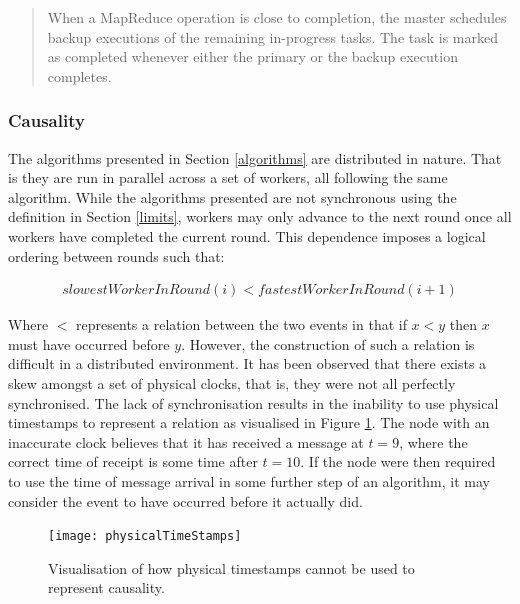 \documentclass[12pt]{article}
\begin{document}
\blockquote{When a MapReduce operation is close
to completion, the master schedules backup executions
of the remaining in-progress tasks. The task is marked
as completed whenever either the primary or the backup
execution completes.}

\subsubsection{Causality}
The algorithms presented in Section \ref{algorithms} are distributed in nature. That is they are run in parallel across a set of workers, all following the same algorithm. While the algorithms presented are not synchronous using the definition in Section \ref{limits}, workers may only advance to the next round once all workers have completed the current round. This dependence imposes a logical ordering between rounds such that:

\begin{align*}
slowestWorkerInRound(i) < fastestWorkerInRound(i+1)
\end{align*}

Where $<$ represents a  relation between the two events in that if $x < y$ then $x$ must have occurred before $y$. However, the construction of such a relation is difficult in a distributed environment. It has been observed that there exists a skew amongst a set of physical clocks, that is, they were not all perfectly synchronised. The lack of synchronisation results in the inability to use physical timestamps to represent a  relation as  visualised in Figure \ref{PhysicalTimestamps}. The node with an inaccurate clock believes that it has received a message at $t = 9$, where the correct time of receipt is some time after $t = 10$. If the node were then required to use the time of message arrival in some further step of an algorithm, it may consider the event to have occurred before it actually did.

\begin{figure}[H]
  \centering
  \texttt{[image: physicalTimeStamps]}
  \caption[]{Visualisation of how physical timestamps cannot be used to represent causality.}
  \label{PhysicalTimestamps}
\end{figure}
\end{document}
